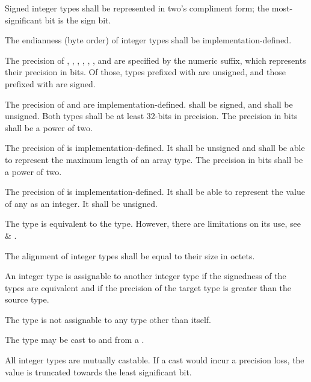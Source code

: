 \specsubsubitem
Signed integer types shall be represented in two's compliment form; the
most-significant bit is the sign bit.

\specsubsubitem
The endianness (byte order) of integer types shall be implementation-defined.

\specsubsubitem
The precision of , , ,
, , , and 
are specified by the numeric suffix, which represents their precision in bits.
Of those, types prefixed with  are unsigned, and those prefixed
with  are signed.

\specsubsubitem
The precision of  and  are
implementation-defined.  shall be signed, and
 shall be unsigned. Both types shall be at least 32-bits in
precision. The precision in bits shall be a power of two.

\specsubsubitem
The precision of  is implementation-defined. It shall be
unsigned and shall be able to represent the maximum length of an array type.
The precision in bits shall be a power of two.

\specsubsubitem
The precision of  is implementation-defined. It shall be
able to represent the value of any  as an integer.
It shall be unsigned.

\specsubsubitem
The  type is equivalent to the  type. However, there
are limitations on its use, see 
\& .

\specsubsubitem
The alignment of integer types shall be equal to their size in octets.

\specsubsubitem
An integer type is assignable to another integer type if the signedness of the
types are equivalent and if the precision of the target type is greater than the
source type.


\specsubsubitem
The  type is not assignable to any type other than itself.

\specsubsubitem
The  type may be cast to and from a
.

\specsubsubitem
All integer types are mutually castable. If a cast would incur a precision loss,
the value is truncated towards the least significant bit.

